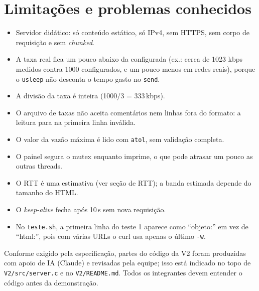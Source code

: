 \documentclass[11pt,a4paper]{article}
\begin{document}
\section{Limitações e problemas conhecidos}

\begin{itemize}
  \item Servidor didático: só conteúdo estático, só IPv4, sem HTTPS, sem corpo de
  requisição e sem \emph{chunked}.
  \item A taxa real fica um pouco abaixo da configurada (ex.: cerca de 1023 kbps medidos
  contra 1000 configurados, e um pouco menos em redes reais), porque o \texttt{usleep} não
  desconta o tempo gasto no \texttt{send}.
  \item A divisão da taxa é inteira (1000/3 = 333\,kbps).
  \item O arquivo de taxas não aceita comentários nem linhas fora do formato: a leitura para
  na primeira linha inválida.
  \item O valor da vazão máxima é lido com \texttt{atol}, sem validação completa.
  \item O painel segura o mutex enquanto imprime, o que pode atrasar um pouco as outras threads.
  \item O RTT é uma estimativa (ver seção de RTT); a banda estimada depende do tamanho do HTML.
  \item O \emph{keep-alive} fecha após 10\,s sem nova requisição.
  \item No \texttt{teste.sh}, a primeira linha do teste 1 aparece como ``objeto:'' em vez de
  ``html:'', pois com várias URLs o curl usa apenas o último \texttt{-w}.
\end{itemize}

\begin{nota}[Uso de IA]
Conforme exigido pela especificação, partes do código da V2 foram produzidas com apoio de IA
(Claude) e revisadas pela equipe; isso está indicado no topo de \texttt{V2/src/server.c} e no
\texttt{V2/README.md}. Todos os integrantes devem entender o código antes da demonstração.
\end{nota}

\end{document}
